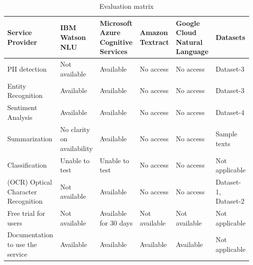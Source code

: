 \begin{table}[h]
\caption{Evaluation matrix} 
\begin{center}
   
  \begin{tabular}{| p{2.7cm} || p{2.7cm} | p{3.5cm} | p{2.12cm} | p{3cm} | p{1.9cm} |}
   
\hline
 \textbf{Service \hspace{1cm} Provider} & \textbf{\acs{IBM} Watson \acs{NLU}} & \textbf{Microsoft Azure Cognitive \hspace{1cm} Services} & \textbf{Amazon \hspace{0.3cm} Textract} & \textbf{Google Cloud Natural \hspace{1cm} Language} & \textbf{Datasets}\\ \hline \hline 
 
     \acs{PII} detection & Not available & Available & No access & No access & Dataset-3\\ [10pt] \hline
     Entity \hspace{0.2cm} Recognition & Available & Available & No access & No access & Dataset-3\\ \hline
     Sentiment Analysis & Available & Available & No access & No access & Dataset-4 \\ \hline
     Summarization & No clarity on availability & Available & No access & No access & Sample texts\\ \hline
     Classification & Unable to test & Unable to test & No access & No access & Not \hspace{1cm} applicable\\ [10pt] \hline 
     (\acs{OCR}) Optical Character Recognition & Not available & Available & No access & No access & Dataset-1, Dataset-2 \\ \hline
     Free trial for users & Not available & Available for 30 days & Not \hspace{1cm} available & Not available & Not \hspace{1cm} applicable\\ [15pt] \hline
     Documentation to use the \hspace{1cm} service & Available & Available & Available & Available & Not \hspace{1cm} applicable\\ \hline
     
\end{tabular}                          
\end{center}
\end{table}
\clearpage

